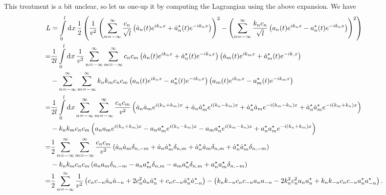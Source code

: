 This treatment is a bit unclear, so let us one-up it by computing the Lagrangian using the above expansion. We have
\begin{align*}
	L &= \int\limits_{0}^{l}\dd[]{x}\frac{1}{2}\left(\frac{1}{v^{2}}\left(\sum\limits_{n = -\infty}^{\infty}\frac{c_{n}}{\sqrt{l}}\left(\dot{a}_{n}(t)e^{ik_{n}x} + \dot{a}_{n}^{\star}(t)e^{-ik_{n}x}\right)\right)^{2} - \left(\sum\limits_{n = -\infty}^{\infty}\frac{k_{n}c_{n}}{\sqrt{l}}\left(a_{n}(t)e^{ik_{n}x} - a_{n}^{\star}(t)e^{-ik_{n}x}\right)\right)^{2}\right) \\
	 =& \frac{1}{2l}\int\limits_{0}^{l}\dd[]{x}\frac{1}{v^{2}}\sum\limits_{n = -\infty}^{\infty}\sum\limits_{m = -\infty}^{\infty}c_{n}c_{m}\left(\dot{a}_{n}(t)e^{ik_{n}x} + \dot{a}_{n}^{\star}(t)e^{-ik_{n}x}\right)\left(\dot{a}_{m}(t)e^{ik_{m}x} + \dot{a}_{m}^{\star}(t)e^{-ik_{,}x}\right) \\
	  &- \sum\limits_{n = -\infty}^{\infty}\sum\limits_{m = -\infty}^{\infty}k_{n}k_{m}c_{n}c_{m}\left(a_{n}(t)e^{ik_{n}x} - a_{n}^{\star}(t)e^{-ik_{n}x}\right)\left(a_{m}(t)e^{ik_{m}x} - a_{m}^{\star}(t)e^{-ik_{m}x}\right) \\
     =& \frac{1}{2l}\int\limits_{0}^{l}\dd[]{x}\sum\limits_{n = -\infty}^{\infty}\sum\limits_{m = -\infty}^{\infty}\frac{c_{n}c_{m}}{v^{2}}\left(\dot{a}_{n}\dot{a}_{m}e^{i(k_{n} + k_{m})x} + \dot{a}_{n}\dot{a}_{m}^{\star} e^{i(k_{n} - k_{m})x} + \dot{a}_{n}^{\star}\dot{a}_{m}e^{-i(k_{m} - k_{n})x} + \dot{a}_{n}^{\star}\dot{a}_{m}^{\star} e^{-i(k_{m} + k_{n})x}\right) \\
      &- k_{n}k_{m}c_{n}c_{m}\left(a_{n}a_{m}e^{i(k_{n} + k_{m})x} - a_{n}a_{m}^{\star} e^{i(k_{n} - k_{m})x} - a_{m}a_{n}^{\star} e^{i(k_{m} - k_{n})x} + a_{n}^{\star} a_{m}^{\star} e^{-i(k_{n} + k_{m})x}\right) \\
     =& \frac{1}{2}\sum\limits_{n = -\infty}^{\infty}\sum\limits_{m = -\infty}^{\infty}\frac{c_{n}c_{m}}{v^{2}}\left(\dot{a}_{n}\dot{a}_{m}\delta_{n, -m} + \dot{a}_{n}\dot{a}_{m}^{\star}\delta_{n, m} + \dot{a}_{n}^{\star}\dot{a}_{m}\delta_{n, m} + \dot{a}_{n}^{\star}\dot{a}_{m}^{\star}\delta_{n, -m}\right) \\
      &- k_{n}k_{m}c_{n}c_{m}\left(a_{n}a_{m}\delta_{n, -m} - a_{n}a_{m}^{\star}\delta_{n, m} - a_{m}a_{n}^{\star}\delta_{n, m} + a_{n}^{\star} a_{m}^{\star}\delta_{n, -m}\right) \\
     =& \frac{1}{2}\sum\limits_{n = -\infty}^{\infty}\frac{1}{v^{2}}\left(c_{n}c_{-n}\dot{a}_{n}\dot{a}_{-n} + 2c_{n}^{2}\dot{a}_{n}\dot{a}_{n}^{\star} + c_{n}c_{-n}\dot{a}_{n}^{\star}\dot{a}_{-n}^{\star}\right) - \left(k_{n}k_{-n}c_{n}c_{-n}a_{n}a_{-n} - 2k_{n}^{2}c_{n}^{2}a_{n}a_{n}^{\star} + k_{n}k_{-n}c_{n}c_{-n}a_{n}^{\star} a_{-n}^{\star}\right).
\end{align*}
